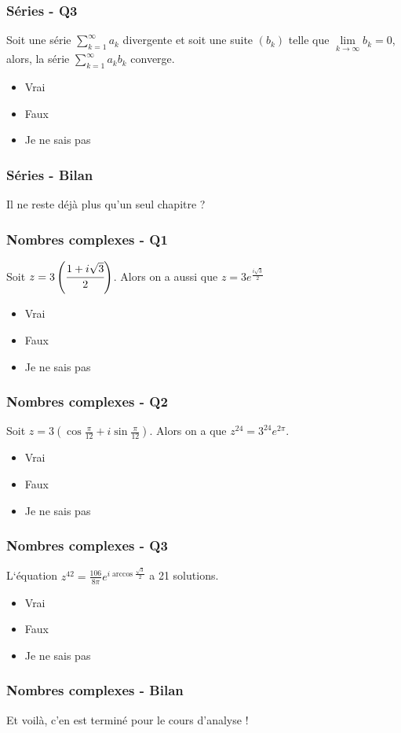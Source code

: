 \documentclass{beamer}
\begin{document}
\begin{frame}
\frametitle{Séries - Q3}
Soit une série \(\displaystyle \sum_{k=1}^\infty a_k\) divergente et soit une suite \((b_k)\) telle que \(\lim \limits_{k \to \infty} b_k = 0\), alors, la série  \(\displaystyle \sum_{k=1}^\infty a_kb_k\) converge.
\begin{itemize}
 \item<1-> Vrai
 \item<1-> Faux
 \item<1-> Je ne sais pas
\end{itemize}
\end{frame}


\begin{frame}
\frametitle{Séries - Bilan}
Il ne reste déjà plus qu'un seul chapitre ?
\end{frame}

\begin{frame}
\frametitle{Nombres complexes - Q1}
Soit \(z = 3\left(\cfrac{1+i \sqrt 3}{2}\right)\). Alors on a aussi que \(z = 3e^{\frac{i \sqrt 3}{2}}\)
\begin{itemize}
 \item<1-> Vrai
 \item<1-> Faux
 \item<1-> Je ne sais pas
\end{itemize}
\end{frame}

\begin{frame}
\frametitle{Nombres complexes - Q2}
Soit \(z = 3(\cos{\frac{\pi}{12}}+i \sin{\frac{\pi}{12}})\). Alors on a que \(z^{24}=3^{24}e^{2\pi}\).
\begin{itemize}
 \item<1-> Vrai
 \item<1-> Faux
 \item<1-> Je ne sais pas
\end{itemize}
\end{frame}

\begin{frame}
\frametitle{Nombres complexes - Q3}
L`équation \(z^{42}=\frac{106}{8\pi}e^{i\arccos{\frac{\sqrt 3}{2}}}\) a 21 solutions.
\begin{itemize}
 \item<1-> Vrai
 \item<1-> Faux
 \item<1-> Je ne sais pas
\end{itemize}
\end{frame}

\begin{frame}
\frametitle{Nombres complexes - Bilan}
Et voilà, c'en est terminé pour le cours d'analyse !

\end{frame}
\end{document}
